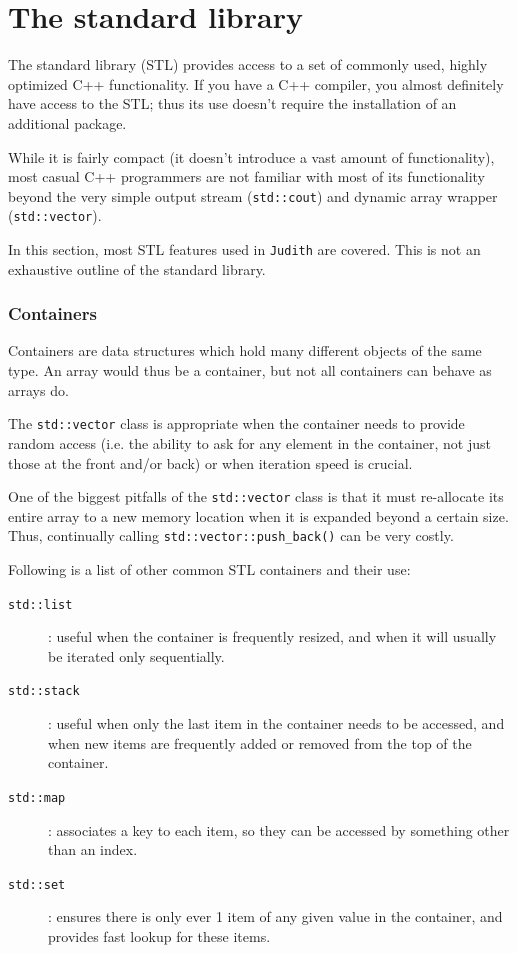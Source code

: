 \documentclass[10pt,a4paper]{book}
\newcommand{\Judith}{\Verb`Judith` }
\begin{document}
\section{The standard library}

The standard library (STL) provides access to a set of commonly used, highly optimized C++ functionality. If you have a C++ compiler, you almost definitely have access to the STL; thus its use doesn't require the installation of an additional package.

While it is fairly compact (it doesn't introduce a vast amount of functionality), most casual C++ programmers are not familiar with most of its functionality beyond the very simple output stream (\Verb`std::cout`) and dynamic array wrapper (\Verb`std::vector`).

In this section, most STL features used in \Judith are covered. This is not an exhaustive outline of the standard library.

\subsubsection{Containers}

Containers are data structures which hold many different objects of the same type. An array would thus be a container, but not all containers can behave as arrays do.

The \Verb`std::vector` class is appropriate when the container needs to provide random access (i.e. the ability to ask for any element in the container, not just those at the front and/or back) or when iteration speed is crucial.

One of the biggest pitfalls of the \Verb`std::vector` class is that it must re-allocate its entire array to a new memory location when it is expanded beyond a certain size. Thus, continually calling \Verb`std::vector::push_back()` can be very costly.

Following is a list of other common STL containers and their use:

\begin{description}
	\item[\Verb`std::list`]: useful when the container is frequently resized, and when it will usually be iterated only sequentially.
	\item[\Verb`std::stack`]: useful when only the last item in the container needs to be accessed, and when new items are frequently added or removed from the top of the container.
	\item[\Verb`std::map`]: associates a key to each item, so they can be accessed by something other than an index.
	\item[\Verb`std::set`]: ensures there is only ever 1 item of any given value in the container, and provides fast lookup for these items.
\end{description}
\end{document}

